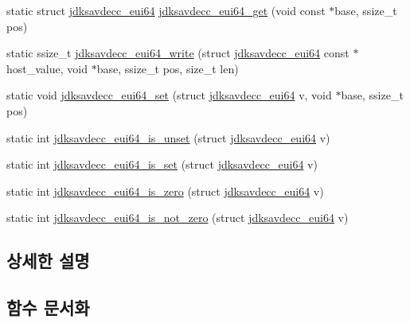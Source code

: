\begin{DoxyCompactItemize}
static struct \hyperlink{structjdksavdecc__eui64}{jdksavdecc\+\_\+eui64} \hyperlink{group__eui64_ga2652311a25a6b91cddbed75c108c7031}{jdksavdecc\+\_\+eui64\+\_\+get} (void const $\ast$base, ssize\+\_\+t pos)
\item 
static ssize\+\_\+t \hyperlink{group__eui64_ga9a35f8b0a8e81f3f169892e3d0f3c7ad}{jdksavdecc\+\_\+eui64\+\_\+write} (struct \hyperlink{structjdksavdecc__eui64}{jdksavdecc\+\_\+eui64} const $\ast$host\+\_\+value, void $\ast$base, ssize\+\_\+t pos, size\+\_\+t len)
\item 
static void \hyperlink{group__eui64_ga1c5b342315464ff77cbc7d587765432d}{jdksavdecc\+\_\+eui64\+\_\+set} (struct \hyperlink{structjdksavdecc__eui64}{jdksavdecc\+\_\+eui64} v, void $\ast$base, ssize\+\_\+t pos)
\item 
static int \hyperlink{group__eui64_ga1b96cdf26ed2929cc2164272f3fba4a0}{jdksavdecc\+\_\+eui64\+\_\+is\+\_\+unset} (struct \hyperlink{structjdksavdecc__eui64}{jdksavdecc\+\_\+eui64} v)
\item 
static int \hyperlink{group__eui64_gaa6f4d16b4bf633bf0eb5346935daac02}{jdksavdecc\+\_\+eui64\+\_\+is\+\_\+set} (struct \hyperlink{structjdksavdecc__eui64}{jdksavdecc\+\_\+eui64} v)
\item 
static int \hyperlink{group__eui64_gafc12f5e32a8146d3a5807a8d87caf1e4}{jdksavdecc\+\_\+eui64\+\_\+is\+\_\+zero} (struct \hyperlink{structjdksavdecc__eui64}{jdksavdecc\+\_\+eui64} v)
\item 
static int \hyperlink{group__eui64_gad14ea4dce7a6716b1cd055c0ec00c150}{jdksavdecc\+\_\+eui64\+\_\+is\+\_\+not\+\_\+zero} (struct \hyperlink{structjdksavdecc__eui64}{jdksavdecc\+\_\+eui64} v)
\end{DoxyCompactItemize}


\subsection{상세한 설명}


\subsection{함수 문서화}
